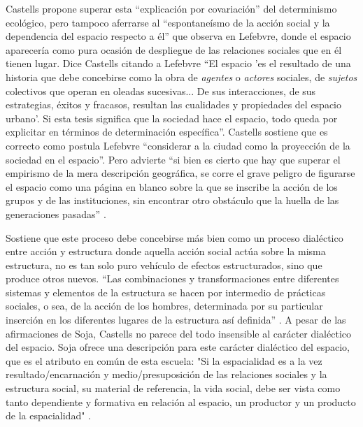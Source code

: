 Castells propone superar esta “explicación por covariación” del determinismo ecológico, pero tampoco aferrarse al “espontaneísmo de la acción social y la dependencia del espacio respecto a él” que observa en Lefebvre, donde el espacio aparecería como pura ocasión de despliegue de las relaciones sociales que en él tienen lugar. Dice Castells citando a Lefebvre “El espacio 'es el resultado de una historia que debe concebirse como la obra de \textit{agentes} o \textit{actores} sociales, de \textit{sujetos} colectivos que operan en oleadas sucesivas... De sus interacciones, de sus estrategias, éxitos y fracasos, resultan las cualidades y propiedades del espacio urbano'. Si esta tesis significa que la sociedad hace el espacio, todo queda por explicitar en términos de determinación específica”. Castells sostiene que es correcto como postula Lefebvre “considerar a la ciudad como la proyección de la sociedad en el espacio”. Pero advierte “si bien es cierto que hay que superar el empirismo de la mera descripción geográfica, se corre el grave peligro de figurarse el espacio como una página en blanco sobre la que se inscribe la acción de los grupos y de las instituciones, sin encontrar otro obstáculo que la huella de las generaciones pasadas” \cite[p.~141]{castells}. 

Sostiene que este proceso debe concebirse más bien como un proceso dialéctico entre acción y estructura donde aquella acción social actúa sobre la misma estructura, no es tan solo puro vehículo de efectos estructurados, sino que produce otros nuevos. “Las combinaciones y transformaciones entre diferentes sistemas y elementos de la estructura se hacen por intermedio de prácticas sociales, o sea, de la acción de los hombres, determinada por su particular inserción en los diferentes lugares de la estructura así definida” \cite[p.~154]{castells}. A pesar de las afirmaciones de Soja, Castells no parece del todo insensible al carácter dialéctico del espacio. Soja ofrece una descripción para este carácter dialéctico del espacio, que es el atributo en común de esta escuela: "Si la espacialidad es a la vez resultado/encarnación y medio/presuposición de las relaciones sociales y la estructura social, su material de referencia, la vida social, debe ser vista como tanto dependiente y formativa en relación al espacio, un productor y un producto de la espacialidad" \cite[p.~129]{soja}.

